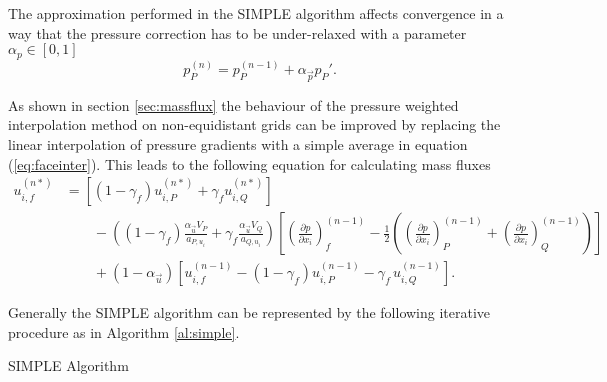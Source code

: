   The approximation performed in the SIMPLE algorithm affects convergence in a way that the pressure correction has to be under-relaxed with a parameter \(\alpha_p \in [0,1]\)
  \begin{equation}
    \label{eq:pressupdate}
    p_P^{(n)} = p_P^{(n-1)} + \alpha_{\vec{p}} p_P'.
  \end{equation}

  As shown in section \ref{sec:massflux} the behaviour of the pressure weighted interpolation method on non-equidistant grids can be improved by replacing the linear interpolation of pressure gradients with a simple average in equation (\ref{eq:faceinter}). This leads to the following equation for calculating mass fluxes
  \begin{align}
    \label{eq:facecorr2}
    u_{i,f}^{(n*)} 
    &=
    \left[\left(1 - \gamma_f\right) u_{i,P}^{(n*)} + \gamma_f u_{i,Q}^{(n*)} \right] \nonumber\\[1em]
    &\quad\quad - 
    \left(\left(1 - \gamma_f\right) \frac{\alpha_\vec{u} V_P}{a_{P,u_i}} + \gamma_f \frac{\alpha_\vec{u} V_Q}{a_{Q,u_i}}\right)
    \left[ 
    \left(\frac{\partial p}{\partial x_i}\right)_f^{(n-1)} 
    -  \frac{1}{2} \left( \left( \frac{\partial p}{\partial x_i} \right)_P^{(n-1)} 
    +  \left(\frac{\partial p}{\partial x_i}\right)_Q^{(n-1)} \right)
    \right] \nonumber \\[1em]
    &\quad\quad + \left(1 - \alpha_\vec{u}\right) \left[ u_{i,f}^{(n-1)} - \left(1 - \gamma_f\right) u_{i,P}^{(n-1)} - \gamma_f \, u_{i,Q}^{(n-1)} \right].
  \end{align}

  Generally the SIMPLE algorithm can be represented by the following iterative procedure as in Algorithm \ref{al:simple}.
\begin{algorithm}
\label{al:simple}
\caption{SIMPLE Algorithm}
\begin{algorithmic}
  \EndIf
\EndWhile
\end{algorithmic}
\end{algorithm}

